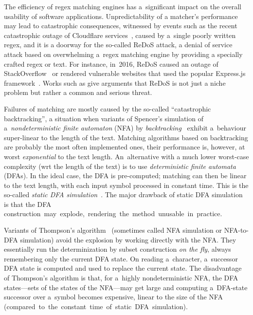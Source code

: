 \documentclass[acmsmall,screen]{acmart}
\begin{document}
The efficiency of regex matching engines has a~significant impact on the overall
usability of software applications.
%
Unpredictability of a matcher's performance may lead to catastrophic consequences,
witnessed by events such as the recent catastrophic outage of Cloudflare
services~\cite{cloudfareoutage}, 
caused by a~single poorly written regex,
and it is a doorway for the so-called ReDoS attack, 
a denial of service attack based on overwhelming a~regex matching engine by providing a specially crafted regex or text.
%
For instance, in~2016, ReDoS caused an outage of StackOverflow~\cite{stackoutage} 
or rendered vulnerable websites that used the popular Express.js framework~\cite{expressjsoutage}.
%
Works such as \cite{rethinkingregexes,redosimpact} give arguments that ReDoS is not just a niche problem but rather a common and serious threat.

Failures of matching are mostly caused by the so-called ``catastrophic
backtracking'', a situation when variants of Spencer's simulation of
a~\emph{nondeterministic finite automaton} (NFA) by
\emph{backtracking}~\cite{spencermatching} exhibit a~behaviour super-linear to
the length of the text.
Matching algorithms based on backtracking are probably the most often implemented ones,
their performance is, however, at worst \emph{exponential} to the text length.
%
An~alternative with a much lower worst-case complexity (wrt the length of the
text) is to use \emph{deterministic finite automata} (DFAs).
%
In the ideal case, the DFA is pre-computed; matching can then be linear to the text length, 
with each input symbol processed in constant time.
This is the so-called \emph{static DFA simulation}~\cite{sipser}. 
%
The major drawback of static DFA simulation is that the DFA \mbox{construction may explode,
rendering the method unusable in practice.}

Variants of Thompson's algorithm~\cite{thompsonmatching} (sometimes called NFA simulation or NFA-to-DFA simulation)
avoid the explosion by working directly with the NFA. They essentially run the
determinization by subset construction \emph{on the fly}, 
always remembering only the current DFA state.
On reading a~character, a~successor DFA state is computed and used to replace
the current state.
The disadvantage of Thompson's algorithm is that, for a~highly nondeterministic
NFA, the DFA states---sets of the states of the NFA---may get large and computing
a~DFA-state successor over a~symbol becomes expensive, linear to the size of
the NFA \mbox{(compared to the constant time of static DFA simulation).}
\end{document}
